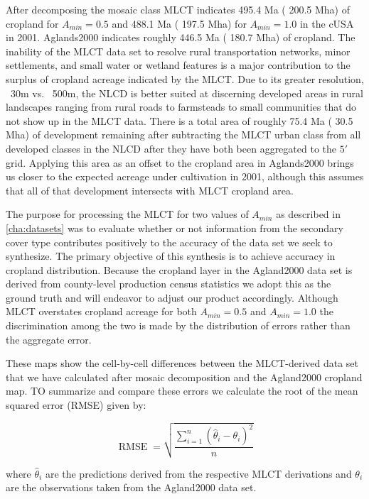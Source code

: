 After decomposing the mosaic class MLCT indicates
495.4 Ma ( 200.5 Mha) of cropland for
$A_{min}=0.5$ and 488.1 Ma ( 197.5 Mha) for
$A_{min}=1.0$ in the cUSA in 2001.  Aglands2000 indicates roughly
446.5 Ma ( 180.7 Mha) of cropland.  The
inability of the MLCT data set to resolve rural transportation
networks, minor settlements, and small water or wetland features is a
major contribution to the surplus of cropland acreage indicated by the
MLCT.  Due to its greater resolution, ~30m vs. ~500m, the NLCD is
better suited at discerning developed areas in rural landscapes
ranging from rural roads to farmsteads to small communities that do
not show up in the MLCT data. There is a total area of roughly
75.4 Ma ( 30.5 Mha)
of development remaining after subtracting the MLCT urban class from
all developed classes in the NLCD after they have both been aggregated
to the $5'$ grid. Applying this area as an offset to the cropland
area in Aglands2000 brings us closer to the expected acreage under
cultivation in 2001, although this assumes that all of that
development intersects with MLCT cropland area.

The purpose for processing the MLCT for two values of $A_{min}$ as
described in \autoref{cha:datasets} was to evaluate whether or not
information from the secondary cover type contributes positively to
the accuracy of the data set we seek to synthesize.  The primary
objective of this synthesis is to achieve accuracy in cropland
distribution.  Because the cropland layer in the Agland2000 data set
is derived from county-level production census statistics we adopt
this as the ground truth and will endeavor to adjust our product
accordingly.  Although MLCT overstates cropland acreage for both
$A_{min}=0.5$ and $A_{min}=1.0$ the discrimination among the two is made
by the distribution of errors rather than the aggregate error.


These maps show the cell-by-cell differences between the MLCT-derived
data set that we have calculated after mosaic decomposition and the
Agland2000 cropland map.  TO summarize and compare these errors we
calculate the root of the mean squared error (RMSE) given by:

$$
\operatorname{RMSE}=\sqrt{\frac{\sum_{i=1}^{n}(\hat\theta_i-\theta_i )^2}{n}}
$$

where $\hat\theta_i$ are the predictions derived from the respective
MLCT derivations and $\theta_i$ are the observations taken from the
Agland2000 data set.





